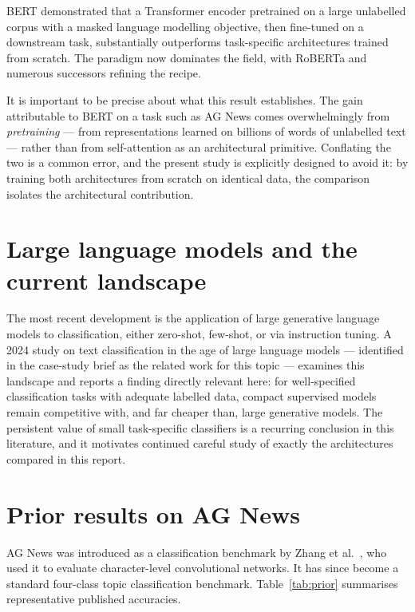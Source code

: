 BERT \cite{devlin2019} demonstrated that a Transformer encoder pretrained on a large unlabelled
corpus with a masked language modelling objective, then fine-tuned on a downstream task,
substantially outperforms task-specific architectures trained from scratch. The paradigm now
dominates the field, with RoBERTa \cite{liu2019} and numerous successors refining the recipe.

It is important to be precise about what this result establishes. The gain attributable to BERT on
a task such as AG News comes overwhelmingly from \emph{pretraining} --- from representations
learned on billions of words of unlabelled text --- rather than from self-attention as an
architectural primitive. Conflating the two is a common error, and the present study is explicitly
designed to avoid it: by training both architectures from scratch on identical data, the
comparison isolates the architectural contribution.

\section{Large language models and the current landscape}

The most recent development is the application of large generative language models to
classification, either zero-shot, few-shot, or via instruction tuning. A 2024 study on text
classification in the age of large language models \cite{mdpi2024} --- identified in the
case-study brief as the related work for this topic --- examines this landscape and reports a
finding directly relevant here: for well-specified classification tasks with adequate labelled
data, compact supervised models remain competitive with, and far cheaper than, large generative
models. The persistent value of small task-specific classifiers is a recurring conclusion in this
literature, and it motivates continued careful study of exactly the architectures compared in this
report.

\section{Prior results on AG News}

AG News was introduced as a classification benchmark by Zhang et al.\ \cite{zhang2015}, who used
it to evaluate character-level convolutional networks. It has since become a standard
four-class topic classification benchmark. Table~\ref{tab:prior} summarises representative
published accuracies.

